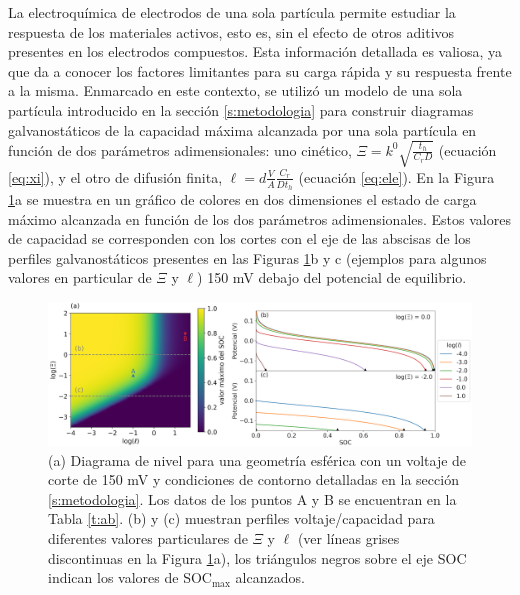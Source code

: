 La electroquímica de electrodos de una sola partícula \cite{ventosa2021, 
heubner2020, takahashi2020, wahab2020, xu2020, tao2019, fukui2011} permite 
estudiar la respuesta  de los materiales activos, esto es, sin el efecto 
de otros aditivos presentes en los electrodos compuestos. Esta información 
detallada es valiosa, ya que da a conocer los factores limitantes para su 
carga rápida y su respuesta frente a la misma. Enmarcado en este contexto, se utilizó un 
modelo de una sola partícula introducido en la sección \ref{s:metodologia} para construir 
diagramas galvanostáticos de la capacidad máxima alcanzada por una sola partícula 
en función de dos parámetros adimensionales: uno cinético,
$\Xi = k^0 \sqrt{\frac{t_h}{C_r D}}$ (ecuación \ref{eq:xi}),
y el otro de difusión finita, $\ell = d \frac{V}{A} \frac{C_r}{D t_h}$
(ecuación \ref{eq:ele}).  En la Figura \ref{fig:diagnostico}a se muestra en
un gráfico de colores en dos dimensiones el
estado de carga máximo alcanzada en función de los dos parámetros adimensionales. Estos valores 
de capacidad se corresponden con los cortes con el eje de las abscisas de los perfiles galvanostáticos presentes en las
Figuras \ref{fig:diagnostico}b y c (ejemplos para algunos valores en particular 
de $\Xi$ y $\ell$) 150 mV debajo del potencial de equilibrio.

\begin{figure}[t]
    \centering
    \includegraphics[width=\textwidth]{FastCharging/un/introduccion/diagnosis-merged.png}
    \caption{(a) Diagrama de nivel para una geometría esférica con un voltaje de 
    corte de 150 mV y condiciones de contorno detalladas en la sección 
    \ref{s:metodologia}. Los datos de los puntos A y B se encuentran en la 
    Tabla \ref{t:ab}. (b) y (c) muestran perfiles voltaje/capacidad para 
    diferentes valores particulares de $\Xi$ y $\ell$ (ver líneas grises 
    discontinuas en la Figura \ref{fig:diagnostico}a), los triángulos negros 
    sobre el eje SOC indican los valores de SOC$_{\max}$ alcanzados.}
    \label{fig:diagnostico}
\end{figure}


